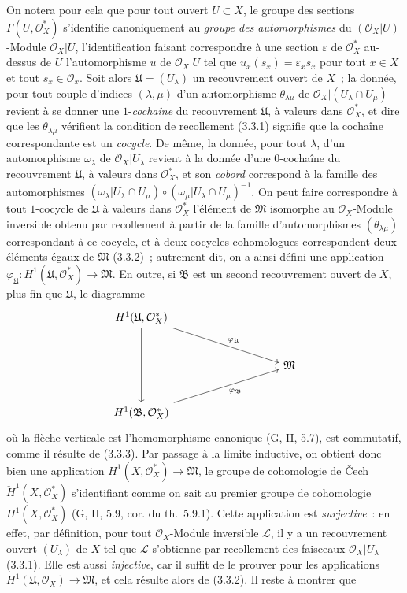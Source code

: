 \begin{env}[5.4.7]
On notera pour cela que pour tout ouvert $U\subset X$, le groupe des sections
$\Gamma(U,\mathcal{O}_X^*)$ s'identifie canoniquement au \emph{groupe des
automorphismes} du $(\mathcal{O}_X|U)$-Module $\mathcal{O}_X|U$,
l'identification faisant correspondre à une section $\varepsilon$ de
$\mathcal{O}_X^*$ au-dessus de $U$ l'automorphisme $u$ de $\mathcal{O}_X|U$
tel que $u_x(s_x)=\varepsilon_xs_x$ pour tout $x\in X$ et tout
$s_x\in\mathcal{O}_x$. Soit alors $\mathfrak{U}=(U_\lambda)$ un recouvrement
ouvert de $X$~; la donnée, pour tout couple d'indices $(\lambda,\mu)$ d'un
automorphisme $\theta_{\lambda\mu}$ de
$\mathcal{O}_X|(U_\lambda\cap U_\mu)$ revient à se donner une
$1$-\emph{cochaîne} du recouvrement $\mathfrak{U}$, à valeurs dans
$\mathcal{O}_X^*$, et dire que les $\theta_{\lambda\mu}$ vérifient la
condition de recollement (3.3.1) signifie que la cochaîne correspondante est
un \emph{cocycle}. De même, la donnée, pour tout $\lambda$, d'un automorphisme
$\omega_\lambda$ de $\mathcal{O}_X|U_\lambda$ revient à la donnée d'une
$0$-cochaîne du recouvrement $\mathfrak{U}$, à valeurs dans
$\mathcal{O}_X^*$, et son \emph{cobord} correspond à la famille des
automorphismes
$(\omega_\lambda|U_\lambda\cap U_\mu)\circ
 (\omega_\mu|U_\lambda\cap U_\mu)^{-1}$.
On peut faire correspondre à tout $1$-cocycle de $\mathfrak{U}$ à valeurs
dans $\mathcal{O}_X^*$ l'élément de $\mathfrak{M}$ isomorphe au
$\mathcal{O}_X$-Module inversible obtenu par recollement à partir de la
famille d'automorphismes $(\theta_{\lambda\mu})$ correspondant à ce cocycle,
et à deux cocycles cohomologues correspondent deux éléments égaux de
$\mathfrak{M}$ (3.3.2)~; autrement dit, on a ainsi défini une application
$\varphi_{\mathfrak{U}}:H^1(\mathfrak{U},\mathcal{O}_X^*)\to\mathfrak{M}$.
En outre, si $\mathfrak{B}$ est un second recouvrement ouvert de $X$, plus fin
que $\mathfrak{U}$, le diagramme
\[
\begin{tikzcd}[column sep=huge,row sep=large]
H^1(\mathfrak{U},\mathcal{O}_X^*)
  \arrow[dd]
  \arrow[rrd,"\varphi_{\mathfrak{U}}"] & & \\
& & \mathfrak{M} \\
H^1(\mathfrak{B},\mathcal{O}_X^*)
  \arrow[rru,swap,"\varphi_{\mathfrak{B}}"] & &
\end{tikzcd}
\]
où la flèche verticale est l'homomorphisme canonique (G, II, 5.7), est
commutatif, comme il résulte de (3.3.3). Par passage à la limite inductive, on
obtient donc bien une application
$H^1(X,\mathcal{O}_X^*)\to\mathfrak{M}$, le groupe de cohomologie de \v{C}ech
$\check{H}^1(X,\mathcal{O}_X^*)$ s'identifiant comme on sait au premier groupe
de cohomologie $H^1(X,\mathcal{O}_X^*)$ (G, II, 5.9, cor. du th.~5.9.1).
Cette application est \emph{surjective}~: en effet, par définition, pour tout
$\mathcal{O}_X$-Module inversible $\mathcal{L}$, il y a un recouvrement ouvert
$(U_\lambda)$ de $X$ tel que $\mathcal{L}$ s'obtienne par recollement des
faisceaux $\mathcal{O}_X|U_\lambda$ (3.3.1). Elle est aussi
\emph{injective}, car il suffit de le prouver pour les applications
$H^1(\mathfrak{U},\mathcal{O}_X)\to\mathfrak{M}$, et cela résulte alors de
(3.3.2). Il reste à montrer que


\end{env}
